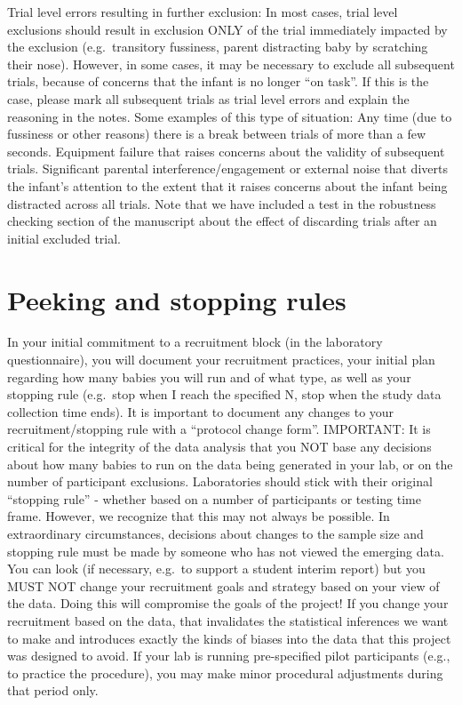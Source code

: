 \documentclass[
]{book}
\begin{document}
Trial level errors resulting in further exclusion: In most cases, trial level exclusions should result in exclusion ONLY of the trial immediately impacted by the exclusion (e.g.~transitory fussiness, parent distracting baby by scratching their nose). However, in some cases, it may be necessary to exclude all subsequent trials, because of concerns that the infant is no longer ``on task''. If this is the case, please mark all subsequent trials as trial level errors and explain the reasoning in the notes. Some examples of this type of situation:
Any time (due to fussiness or other reasons) there is a break between trials of more than a few seconds.
Equipment failure that raises concerns about the validity of subsequent trials.
Significant parental interference/engagement or external noise that diverts the infant's attention to the extent that it raises concerns about the infant being distracted across all trials.
Note that we have included a test in the robustness checking section of the manuscript about the effect of discarding trials after an initial excluded trial.

\hypertarget{peeking-and-stopping-rules}{%
\section{Peeking and stopping rules}\label{peeking-and-stopping-rules}}

In your initial commitment to a recruitment block (in the laboratory questionnaire), you will document your recruitment practices, your initial plan regarding how many babies you will run and of what type, as well as your stopping rule (e.g.~stop when I reach the specified N, stop when the study data collection time ends). It is important to document any changes to your recruitment/stopping rule with a ``protocol change form''.
IMPORTANT: It is critical for the integrity of the data analysis that you NOT base any decisions about how many babies to run on the data being generated in your lab, or on the number of participant exclusions.
Laboratories should stick with their original ``stopping rule'' - whether based on a number of participants or testing time frame. However, we recognize that this may not always be possible. In extraordinary circumstances, decisions about changes to the sample size and stopping rule must be made by someone who has not viewed the emerging data.
You can look (if necessary, e.g.~to support a student interim report) but you MUST NOT change your recruitment goals and strategy based on your view of the data. Doing this will compromise the goals of the project!
If you change your recruitment based on the data, that invalidates the statistical inferences we want to make and introduces exactly the kinds of biases into the data that this project was designed to avoid. If your lab is running pre-specified pilot participants (e.g., to practice the procedure), you may make minor procedural adjustments during that period only.
\end{document}
